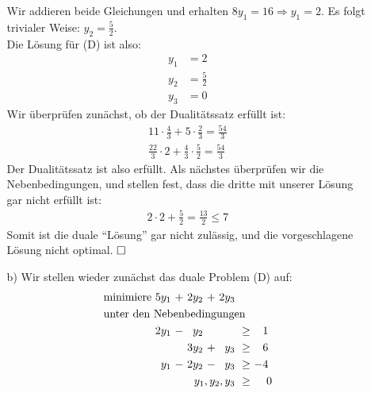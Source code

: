 \documentclass [a4paper,11pt]{article}
\begin{document}
\begin{enumerate}
\begin{enumerate}
                    Wir addieren beide Gleichungen und erhalten $8y_1 = 16 \Rightarrow y_1 = 2$. Es folgt trivialer Weise: $y_2 = \frac{5}{2}$.\\
                    Die Lösung für (D) ist also:
                    \begin{align*}
                        y_1 &= 2\\
                        y_2 &= \frac{5}{2}\\
                        y_3 &= 0
                    \end{align*}
                    Wir überprüfen zunächst, ob der Dualitätssatz erfüllt ist:
                    \begin{align*}
                        11 \cdot \frac{4}{3} + 5 \cdot \frac{2}{3} = \frac{54}{3}\\
                        \frac{22}{3} \cdot 2 + \frac{4}{3} \cdot \frac{5}{2} = \frac{54}{3}
                    \end{align*}
                    Der Dualitätssatz ist also erfüllt.
                    Als nächstes überprüfen wir die Nebenbedingungen, und stellen fest, dass die dritte mit unserer Lösung gar nicht erfüllt ist:
                    \begin{align*}
                        2 \cdot 2 + \frac{5}{2} = \frac{13}{2} \leq 7
                    \end{align*}
                    Somit ist die duale ``Lösung'' gar nicht zulässig, und die vorgeschlagene Lösung nicht optimal. $\qed$
                \item[b)]
                    Wir stellen wieder zunächst das duale Problem (D) auf:
                    \begin{align*}
                    \begin{alignedat}{6}
                    & \text{minimiere } & 5y_1 &\ + &\ 2y_2 &\ + &\ 2y_3 & & \\
                    & \rlap{unter den Nebenbedingungen} & & & & & & & \\
                    && 2y_1 &\ - &\  y_2 &    &       &\ \geq &\  1\ \\
                    &&      &    &\ 3y_2 &\ + &\  y_3 &\ \geq &\  6\ \\
                    &&  y_1 &\ - &\ 2y_2 &\ - &\  y_3 &\ \geq &\ -4\ \\
                    && & & & & \llap{$y_1,y_2,y_3$} &\ \geq &\ 0
                    \end{alignedat}
                    \end{align*}

\end{enumerate}
\end{enumerate}
\end{document}
